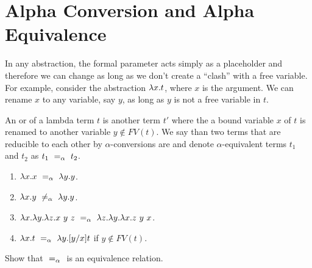 \section{Alpha Conversion and Alpha Equivalence}
\label{sec:lcs::alpha}
In any abstraction, the formal parameter acts simply as a placeholder and therefore we can change as long as we don't create a ``clash'' with a free variable.
%
For example, consider the abstraction $\lambda x.t$, where $x$ is the argument. We can rename $x$ to any variable, say $y$, as long as $y$ is not a free variable in $t$.
%

\begin{flex}
\begin{definition}
\label{def:lcs::alpha}
An  or  of a lambda
term $t$ is
%
another term $t'$ where the a bound variable $x$ of $t$ is renamed to another variable $y \not\in FV(t)$.
%
We say than two terms that are reducible to each other by $\alpha$-conversions are 
%
and
%
denote $\alpha$-equivalent terms $t_1$ and
$t_2$ as $t_1 ~=_{\alpha}~ t_2$.
\end{definition}

\begin{example}
\begin{enumerate}
\item $\lambda x.x ~=_{\alpha}~ \lambda y.y$. 
\item $\lambda x.y ~\neq_{\alpha}~ \lambda y.y$. 
\item $\lambda x. \lambda y. \lambda z. x ~y~z ~=_{\alpha}~ \lambda z. \lambda y. \lambda x. z~y~x$.
\item $\lambda x.t ~=_{\alpha}~ \lambda y.[y/x]t$ if  $y \not\in FV(t)$.
\end{enumerate}
\end{example}
\end{flex}

\begin{exercise}
\label{xrcs::alphha-eq-is-eq}
Show that $~=_{\alpha}~$ is an equivalence relation.
\end{exercise}


